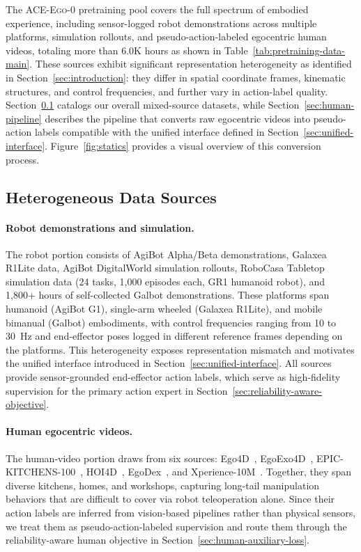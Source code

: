 \documentclass{llmxive}
\providecommand{\OURS}{\textsc{ACE-Ego-0}\xspace}
\providecommand{\Ours}{\OURS}
\begin{document}
The \Ours pretraining pool covers the full spectrum of embodied experience, including sensor-logged robot demonstrations across multiple platforms, simulation rollouts, and pseudo-action-labeled egocentric human videos, totaling more than 6.0K hours as shown in Table~\ref{tab:pretraining-data-main}. These sources exhibit significant representation heterogeneity as identified in Section~\ref{sec:introduction}: they differ in spatial coordinate frames, kinematic structures, and control frequencies, and further vary in action-label quality.
Section~\ref{sec:data-sources} catalogs our overall mixed-source datasets, while Section~\ref{sec:human-pipeline} describes the pipeline that converts raw egocentric videos into pseudo-action labels compatible with the unified interface defined in Section~\ref{sec:unified-interface}. Figure~\ref{fig:statics} provides a visual overview of this conversion process.

\subsection{Heterogeneous Data Sources}
\label{sec:data-sources}



\paragraph{Robot demonstrations and simulation.}
The robot portion consists of AgiBot Alpha/Beta demonstrations, Galaxea R1Lite data, AgiBot DigitalWorld simulation rollouts, RoboCasa Tabletop simulation data (24 tasks, 1,000 episodes each, GR1 humanoid robot), and 1,800+ hours of self-collected Galbot demonstrations. These platforms span humanoid (AgiBot G1), single-arm wheeled (Galaxea R1Lite), and mobile bimanual (Galbot) embodiments, with control frequencies ranging from 10 to 30~Hz and end-effector poses logged in different reference frames depending on the platforms. This heterogeneity exposes representation mismatch and motivates the unified interface introduced in Section~\ref{sec:unified-interface}. All sources provide sensor-grounded end-effector action labels, which serve as high-fidelity supervision for the primary action expert in Section~\ref{sec:reliability-aware-objective}.

\paragraph{Human egocentric videos.}
The human-video portion draws from six sources: Ego4D~\cite{grauman2022ego4d}, EgoExo4D~\cite{grauman2024egoexo4d}, EPIC-KITCHENS-100~\cite{damen2018epic}, HOI4D~\cite{liu2022hoi4d}, EgoDex~\cite{hoque2025egodex}, and Xperience-10M~\cite{xperience_10m}. Together, they span diverse kitchens, homes, and workshops, capturing long-tail manipulation behaviors that are difficult to cover via robot teleoperation alone. Since their action labels are inferred from vision-based pipelines rather than physical sensors, we treat them as pseudo-action-labeled supervision and route them through the reliability-aware human objective in Section~\ref{sec:human-auxiliary-loss}.
\end{document}
